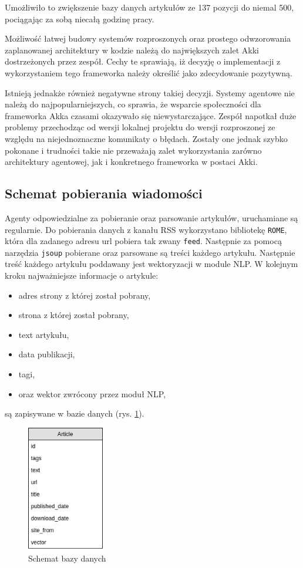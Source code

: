 Umożliwiło to zwiększenie bazy danych artykułów ze 137 pozycji do niemal 500, pociągając za sobą niecałą godzinę pracy.
\par Możliwość łatwej budowy systemów rozproszonych oraz prostego odwzorowania zaplanowanej architektury w kodzie należą do największych zalet Akki dostrzeżonych przez zespół. Cechy te sprawiają, iż decyzję o implementacji z wykorzystaniem tego frameworka należy określić jako zdecydowanie pozytywną.
\par Istnieją jednakże również negatywne strony takiej decyzji. Systemy agentowe nie należą do najpopularniejszych, co sprawia, że wsparcie społeczności dla frameworka Akka czasami okazywało się niewystarczające. Zespół napotkał duże problemy przechodząc od wersji lokalnej projektu do wersji rozproszonej ze względu na niejednoznaczne komunikaty o błędach. Zostały one jednak szybko pokonane i trudności takie nie przeważają zalet wykorzystania zarówno architektury agentowej, jak i konkretnego frameworka w postaci Akki.

\subsection{Schemat pobierania wiadomości}

Agenty odpowiedzialne za pobieranie oraz parsowanie artykułów, uruchamiane są 
regularnie.
Do pobierania danych z kanału RSS wykorzystano bibliotekę 
\texttt{ROME}, która dla zadanego adresu url pobiera tak zwany \texttt{feed}. Następnie za pomocą narzędzia \texttt{jsoup} 
pobierane oraz parsowane są treści każdego artykułu. 
Następnie treść każdego artykułu poddawany jest wektoryzacji w module NLP. W kolejnym kroku najważniejsze informacje o artykule:
\begin{itemize}
\item adres strony z której został pobrany,
\item strona z której został pobrany,
\item text artykułu,
\item data publikacji,
\item tagi,
\item oraz wektor zwrócony przez moduł NLP,
\end{itemize}
są zapisywane w bazie danych (rys. \ref{fig:db}).

\begin{figure}[ht!]
\centering
\includegraphics[height=0.3\textheight, width=0.3\textwidth]{./pict/db.png}
\caption{Schemat bazy danych}
\label{fig:db}
\end{figure}